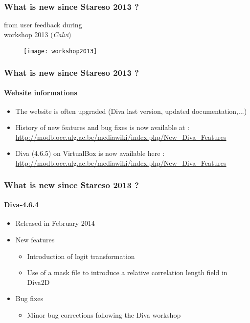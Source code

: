 \begin{frame}
\frametitle{What is new since Stareso 2013 ?}

 from user feedback during \\
\diva workshop 2013 (\textit{Calvi})

\begin{figure}
\centering
\texttt{[image: workshop2013]}
\end{figure}

\end{frame}
\begin{frame}
 \frametitle{What is new since Stareso 2013 ?}
 \framesubtitle{Website informations}
 \begin{itemize}
  \item The website is often upgraded (Diva last version, updated documentation,...)
  \item History of new features and bug fixes is now available at : \url{http://modb.oce.ulg.ac.be/mediawiki/index.php/New_Diva_Features}
  \item Diva (4.6.5) on VirtualBox is now available here : \url{http://modb.oce.ulg.ac.be/mediawiki/index.php/New_Diva_Features}
  \end{itemize}
\end{frame}
\begin{frame}
 \frametitle{What is new since Stareso 2013 ?}
 \framesubtitle{Diva-4.6.4}
 \begin{itemize}
  \item Released in February 2014
  \item New features
  \begin{itemize}
  \item Introduction of logit transformation
  \item Use of a mask file to introduce a relative correlation length field in Diva2D 
  \end{itemize}
  \item Bug fixes
  \begin{itemize}
  \item Minor bug corrections following the Diva workshop 
  \end{itemize}
  \end{itemize}
\end{frame}
